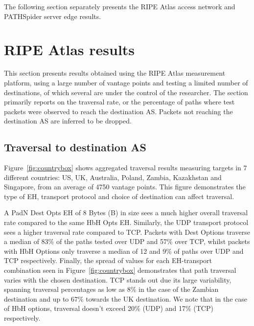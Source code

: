 \documentclass[conference]{IEEEtran}
\begin{document}
The following section separately presents the RIPE Atlas access network and PATHSpider server edge results.

\section{RIPE Atlas results} 
\label{sec:ripe-results}

This section presents results obtained using the RIPE Atlas measurement platform, using a large number of vantage points and testing a limited number of destinations, of which several are under the control of the researcher. The section primarily reports on the traversal rate, or the percentage of paths where test packets were observed to reach the destination AS. Packets not reaching the destination AS are inferred to be dropped. 

\subsection{Traversal to destination AS}

Figure~\ref{fig:countrybox} shows aggregated traversal results measuring targets in 7 different countries: US, UK, Australia, Poland, Zambia, Kazakhstan and Singapore, from an average of 4750 vantage points. This figure demonstrates the type of EH, transport protocol and choice of destination can affect traversal.

A PadN Dest Opts EH of 8 Bytes (B) in size sees a much higher overall traversal rate compared to the same HbH Opts EH. Similarly, the UDP transport protocol sees a higher traversal rate compared to TCP. Packets with Dest Options traverse a median of 83\% of the paths tested over UDP and 57\% over TCP, whilst packets with HbH Options only traverse a median of 12 and 9\% of paths over UDP and TCP respectively.
Finally, the spread of values for each EH-transport combination seen in Figure~\ref{fig:countrybox} demonstrates that path traversal varies with the chosen destination. TCP stands out due its large variability, spanning traversal percentages as low as 8\% in the case of the Zambian destination and up to 67\% towards the UK destination. We note that in the case of HbH options, traversal doesn't exceed 20\% (UDP) and 17\% (TCP) respectively.
\end{document}
